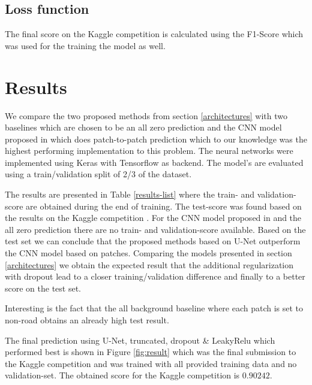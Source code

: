 \documentclass[10pt,conference,compsocconf]{IEEEtran}
\begin{document}
\subsection{Loss function}

The final score on the Kaggle competition \cite{KaggleCompetition} is calculated using the F1-Score which was used for the training the model as well.

\section{Results}

We compare the two proposed methods from section \ref{architectures} with two baselines which are chosen to be an all zero prediction and the CNN model proposed in \cite{Pavllo2017} which does patch-to-patch prediction which to our knowledge was the highest performing implementation to this problem. The neural networks were implemented using Keras with Tensorflow as backend. The model's are evaluated using a train/validation split of 2/3 of the dataset.

The results are presented in Table \ref{results-list} where the train- and validation-score are obtained during the end of training. The test-score was found based on the results on the Kaggle competition \cite{KaggleCompetition}. For the CNN model proposed in \cite{Pavllo2017} and the all zero prediction there are no train- and validation-score available. Based on the test set we can conclude that the proposed methods based on U-Net outperform the CNN model based on patches. Comparing the models presented in section \ref{architectures} we obtain the expected result that the additional regularization with dropout lead to a closer training/validation difference and finally to a better score on the test set.

Interesting is the fact that the all background baseline where each patch is set to non-road obtains an already high test result.

The final prediction using U-Net, truncated, dropout \& LeakyRelu which performed best is shown in Figure \ref{fig:result} which was the final submission to the Kaggle competition and was trained with all provided training data and no validation-set. The obtained score for the Kaggle competition is $0.90242$.
\end{document}
